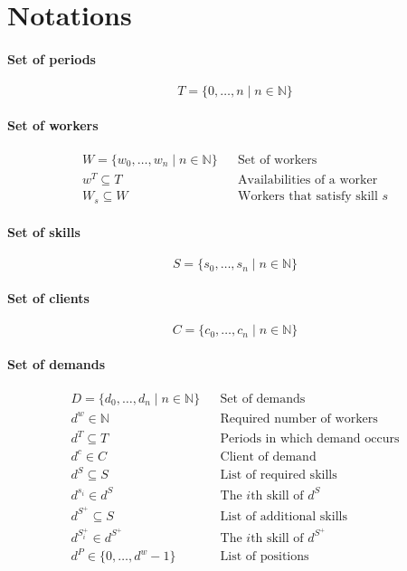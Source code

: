 \documentclass[../../thesis.tex]{subfiles}
\begin{document}
\section{Notations}

\paragraph{Set of periods}
\begin{equation*}
  T = \{ 0, \dots, n \mid n \in \mathbb{N} \}
\end{equation*}


\paragraph{Set of workers}

\begin{align*}
  W = \{ w_0, \dots, w_n \mid n \in \mathbb{N} \} && \text{Set of workers} \\
  w^T \subseteq T && \text{Availabilities of a worker} \\ 
  W_s \subseteq W && \text{Workers that satisfy skill $s$}
\end{align*} 

\paragraph{Set of skills}

\begin{equation*}
  S = \{ s_0, \dots, s_n \mid n \in \mathbb{N} \}
\end{equation*}

\paragraph{Set of clients}

\begin{equation*}
    C = \{ c_0, \dots, c_n \mid n \in \mathbb{N} \}
\end{equation*}

\paragraph{Set of demands}

\begin{align*}
  D = \{ d_0, \dots, d_n \mid n \in \mathbb{N} \} && \text{Set of demands} \\
  d^w \in \mathbb{N} && \text{Required number of workers} \\ 
  d^T \subseteq T && \text{Periods in which demand occurs} \\ 
  d^c \in C && \text{Client of demand} \\ 
  d^S \subseteq S && \text{List of required skills} \\
  d^{s_i} \in d^S && \text{The $i$th skill of $d^S$} \\ 
  d^{S^+} \subseteq S && \text{List of additional skills} \\ 
  d^{S^+_i} \in d^{S^+} && \text{The $i$th skill of $d^{S^+}$} \\ 
  d^P \in \{ 0, \dots, d^w - 1 \} && \text{List of positions}
\end{align*}
\end{document}

